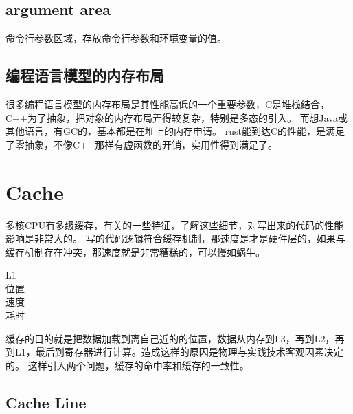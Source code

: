 \subsection{argument area}
命令行参数区域，存放命令行参数和环境变量的值。

\subsection{编程语言模型的内存布局}
很多编程语言模型的内存布局是其性能高低的一个重要参数，C是堆栈结合，C++为了抽象，把对象的内存布局弄得较复杂，特别是多态的引入。
而想Java或其他语言，有GC的，基本都是在堆上的内存申请。
rust能到达C的性能，是满足了零抽象，不像C++那样有虚函数的开销，实用性得到满足了。

\section{Cache}

多核CPU有多级缓存，有关的一些特征，了解这些细节，对写出来的代码的性能影响是非常大的。
写的代码逻辑符合缓存机制，那速度是才是硬件层的，如果与缓存机制存在冲突，那速度就是非常糟糕的，可以慢如蜗牛。

\begin{description}
    \item [L1] 
    \item [位置] 
    \item [速度] 
    \item [耗时] 
\end{description}

缓存的目的就是把数据加载到离自己近的的位置，数据从内存到L3，再到L2，再到L1，最后到寄存器进行计算。造成这样的原因是物理与实践技术客观因素决定的。
这样引入两个问题，缓存的命中率和缓存的一致性。

\subsection{Cache Line}


